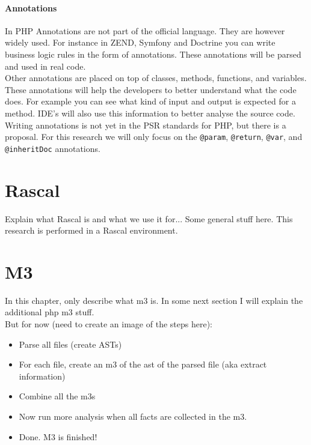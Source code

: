 \documentclass[../main.tex]{subfiles}
\begin{document}
    

    \paragraph{Annotations}
    In PHP Annotations are not part of the official language.
    They are however widely used. 
    For instance in ZEND, Symfony and Doctrine you can write business logic rules in the form of annotations.
    These annotations will be parsed and used in real code.
    \\
    Other annotations are placed on top of classes, methods, functions, and variables.
    These annotations will help the developers to better understand what the code does. 
    For example you can see what kind of input and output is expected for a method.
    IDE's will also use this information to better analyse the source code.
    \\
    Writing annotations is not yet in the PSR standards for PHP, but there is a proposal\footnotemark.
    For this research we will only focus on the \texttt{@param}, \texttt{@return}, \texttt{@var}, and \texttt{@inheritDoc} annotations.
    
    \section{Rascal}
    Explain what \Gls{Rascal} is and what we use it for...
    Some general stuff here.
    This research is performed in a Rascal environment.

    \section{M3}
    In this chapter, only describe what m3 is.
    In some next section I will explain the additional php m3 stuff.
    \\
    But for now (need to create an image of the steps here):
    \begin{itemize}
        \item Parse all files (create \gls{AST}s)
        \item For each file, create an m3 of the ast of the parsed file (aka extract information)
        \item Combine all the m3s
        \item Now run more analysis when all facts are collected in the m3.
        \item Done. M3 is finished! 
    \end{itemize}
\end{document}
